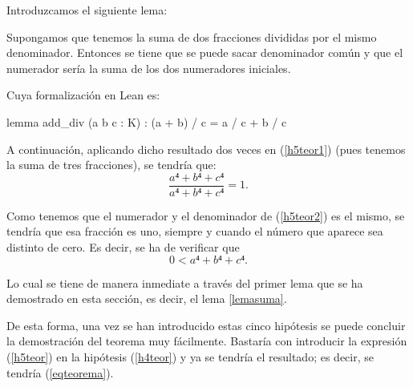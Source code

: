 \begin{demostracion}
\begin{itemize}
    Introduzcamos el siguiente lema:
    \begin{lema}
      Supongamos que tenemos la suma de dos fracciones divididas por el
      mismo denominador. Entonces se tiene que se puede sacar denominador
      común y que el numerador sería la suma de los dos numeradores
      iniciales.
    \end{lema}

    Cuya formalización en Lean es:
    \begin{leancode}
    lemma add_div (a b c : K) : (a + b) / c = a / c + b / c
    \end{leancode}

    A continuación, aplicando dicho resultado dos veces en (\ref{h5teor1})
    (pues tenemos la suma de tres fracciones), se tendría que:
    \begin{equation}\label{h5teor2}
      \frac{a⁴+b⁴+c⁴}{a⁴+b⁴+c⁴}=1.
    \end{equation}

    Como tenemos que el numerador y el denominador de (\ref{h5teor2}) es
    el mismo, se tendría que esa fracción es uno, siempre y cuando el
    número que aparece sea distinto de cero. Es decir, se ha de verificar
    que
    \begin{equation}
      0 < a⁴+b⁴+c⁴.
    \end{equation}

    Lo cual se tiene de manera inmediate a través del primer lema que
    se ha demostrado en esta sección, es decir, el lema \ref{lemasuma}.
  \end{itemize}

  De esta forma, una vez se han introducido estas cinco hipótesis se puede
  concluir la demostración del teorema muy fácilmente. Bastaría con
  introducir la expresión (\ref{h5teor}) en la hipótesis (\ref{h4teor})
  y ya se tendría el resultado; es decir, se tendría (\ref{eqteorema}).
\end{demostracion}

